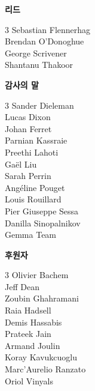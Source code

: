\noindent\textbf{리드}

\begin{multicols}{3}
\noindent
Sebastian Flennerhag \\ 
Brendan O'Donoghue \\ 
George Scrivener \\ 
Shantanu Thakoor
\end{multicols}

\noindent\textbf{감사의 말}

\begin{multicols}{3}
\noindent
Sander Dieleman \\
Lucas Dixon \\
Johan Ferret \\
Parnian Kassraie \\
Preethi Lahoti \\
Gaël Liu \\
Sarah Perrin \\
Angéline Pouget \\
Louis Rouillard \\
Pier Giuseppe Sessa \\
Danilla Sinopalnikov \\
Gemma Team \\
\end{multicols}

\noindent\textbf{후원자}

\begin{multicols}{3}
\noindent
Olivier Bachem \\ 
Jeff Dean \\ 
Zoubin Ghahramani \\ 
Raia Hadsell \\ 
Demis Hassabis \\ 
Prateek Jain \\ 
Armand Joulin \\ 
Koray Kavukcuoglu \\ 
Marc’Aurelio Ranzato \\ 
Oriol Vinyals
\end{multicols}
